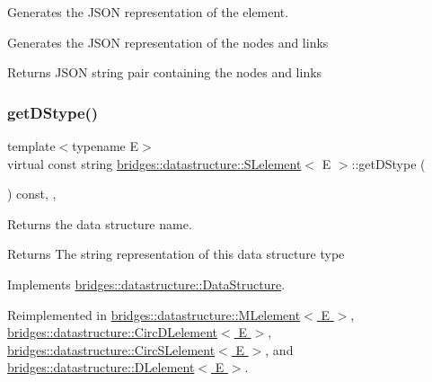 Generates the J\+S\+ON representation of the element. 

Generates the J\+S\+ON representation of the nodes and links \begin{DoxyReturn}{Returns}
J\+S\+ON string pair containing the nodes and links 
\end{DoxyReturn}
\mbox{\label{classbridges_1_1datastructure_1_1_s_lelement_a602156aacacd73d1faa365d68d8af31b}} 
\subsubsection{\texorpdfstring{get\+D\+Stype()}{getDStype()}}
{\footnotesize\ttfamily template$<$typename E$>$ \\
virtual const string \hyperlink{classbridges_1_1datastructure_1_1_s_lelement}{bridges\+::datastructure\+::\+S\+Lelement}$<$ E $>$\+::get\+D\+Stype (\begin{DoxyParamCaption}{ }\end{DoxyParamCaption}) const\hspace{0.3cm}{\ttfamily [inline]}, {\ttfamily [override]}, {\ttfamily [virtual]}}



Returns the data structure name. 

\begin{DoxyReturn}{Returns}
The string representation of this data structure type 
\end{DoxyReturn}


Implements \hyperlink{classbridges_1_1datastructure_1_1_data_structure_a4ff66cb34409f11fe9fc647f6d8a22ce}{bridges\+::datastructure\+::\+Data\+Structure}.



Reimplemented in \hyperlink{classbridges_1_1datastructure_1_1_m_lelement_a735c3cb43648b4d4e7d3316cdc1a1952}{bridges\+::datastructure\+::\+M\+Lelement$<$ E $>$}, \hyperlink{classbridges_1_1datastructure_1_1_circ_d_lelement_aec7f9b9dc6626c1a872feb91cd65425d}{bridges\+::datastructure\+::\+Circ\+D\+Lelement$<$ E $>$}, \hyperlink{classbridges_1_1datastructure_1_1_circ_s_lelement_a775ba08a7811fe91c396cb27ba9343ab}{bridges\+::datastructure\+::\+Circ\+S\+Lelement$<$ E $>$}, and \hyperlink{classbridges_1_1datastructure_1_1_d_lelement_a736ba8e6901608fb0ab04d781d2cceee}{bridges\+::datastructure\+::\+D\+Lelement$<$ E $>$}.

